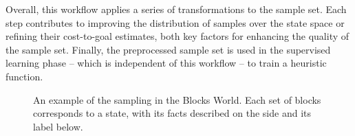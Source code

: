 Overall, this workflow applies a series of transformations to the sample set. Each step contributes to improving the distribution of samples over the state space or refining their cost-to-goal estimates, both key factors for enhancing the quality of the sample set. Finally, the preprocessed sample set is used in the supervised learning phase -- which is independent of this workflow -- to train a heuristic function.


\begin{figure}[ht]
    \caption[An example of the sampling in the Blocks World.]{An example of the sampling in the Blocks World. Each set of blocks corresponds to a state, with its facts described on the side and its label below.}
    \label{fig:example}
    \addvspace{\baselineskip}
    \centering
\end{figure}
